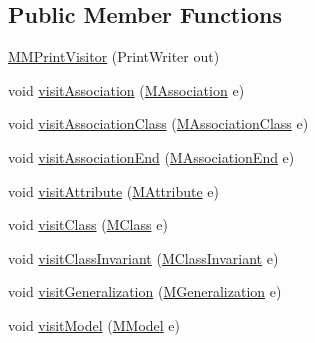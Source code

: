 \subsection*{Public Member Functions}
\begin{DoxyCompactItemize}
\item 
\hyperlink{classorg_1_1tzi_1_1use_1_1uml_1_1mm_1_1_m_m_print_visitor_a9c80e999ca1170a3f192a8ade30610ef}{M\-M\-Print\-Visitor} (Print\-Writer out)
\item 
void \hyperlink{classorg_1_1tzi_1_1use_1_1uml_1_1mm_1_1_m_m_print_visitor_ad629924fc5f9fc1f10366d4c9ea59402}{visit\-Association} (\hyperlink{interfaceorg_1_1tzi_1_1use_1_1uml_1_1mm_1_1_m_association}{M\-Association} e)
\item 
void \hyperlink{classorg_1_1tzi_1_1use_1_1uml_1_1mm_1_1_m_m_print_visitor_ac07540111d210149e37b87d3a64d9287}{visit\-Association\-Class} (\hyperlink{interfaceorg_1_1tzi_1_1use_1_1uml_1_1mm_1_1_m_association_class}{M\-Association\-Class} e)
\item 
void \hyperlink{classorg_1_1tzi_1_1use_1_1uml_1_1mm_1_1_m_m_print_visitor_a57d302a28df13893776a4ec6ae994a7a}{visit\-Association\-End} (\hyperlink{classorg_1_1tzi_1_1use_1_1uml_1_1mm_1_1_m_association_end}{M\-Association\-End} e)
\item 
void \hyperlink{classorg_1_1tzi_1_1use_1_1uml_1_1mm_1_1_m_m_print_visitor_a4bb24e5cad038f0d86c825883dd38b03}{visit\-Attribute} (\hyperlink{classorg_1_1tzi_1_1use_1_1uml_1_1mm_1_1_m_attribute}{M\-Attribute} e)
\item 
void \hyperlink{classorg_1_1tzi_1_1use_1_1uml_1_1mm_1_1_m_m_print_visitor_a5c70860f470a44d49a68d4e024631659}{visit\-Class} (\hyperlink{interfaceorg_1_1tzi_1_1use_1_1uml_1_1mm_1_1_m_class}{M\-Class} e)
\item 
void \hyperlink{classorg_1_1tzi_1_1use_1_1uml_1_1mm_1_1_m_m_print_visitor_ad75fa8ca4decbc22a2ce0887aa302ce6}{visit\-Class\-Invariant} (\hyperlink{classorg_1_1tzi_1_1use_1_1uml_1_1mm_1_1_m_class_invariant}{M\-Class\-Invariant} e)
\item 
void \hyperlink{classorg_1_1tzi_1_1use_1_1uml_1_1mm_1_1_m_m_print_visitor_a3fc80fff4af8938215fbd4c1f8eb28b7}{visit\-Generalization} (\hyperlink{classorg_1_1tzi_1_1use_1_1uml_1_1mm_1_1_m_generalization}{M\-Generalization} e)
\item 
void \hyperlink{classorg_1_1tzi_1_1use_1_1uml_1_1mm_1_1_m_m_print_visitor_ab3cd9533cfbaf162a555861618ad42d3}{visit\-Model} (\hyperlink{classorg_1_1tzi_1_1use_1_1uml_1_1mm_1_1_m_model}{M\-Model} e)
\item 

\end{DoxyCompactItemize}
